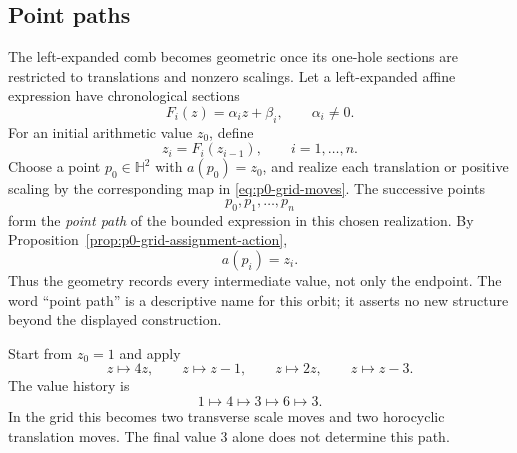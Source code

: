 \subsection{Point paths}
\label{subsec:p0-point-paths}

The left-expanded comb becomes geometric once its one-hole sections are
restricted to translations and nonzero scalings.  Let a left-expanded affine
expression have chronological sections
\[
  F_i(z)=\alpha_i z+\beta_i,
  \qquad \alpha_i\ne0.
\]
For an initial arithmetic value $z_0$, define
\[
  z_i=F_i(z_{i-1}),
  \qquad i=1,\ldots,n.
\]
Choose a point $p_0\in\mathbb H^2$ with $a(p_0)=z_0$, and realize each
translation or positive scaling by the corresponding map in
\eqref{eq:p0-grid-moves}.  The successive points
\[
  p_0,p_1,\ldots,p_n
\]
form the \emph{point path} of the bounded expression in this chosen realization.
By Proposition~\ref{prop:p0-grid-assignment-action},
\[
  a(p_i)=z_i.
\]
Thus the geometry records every intermediate value, not only the endpoint.  The
word ``point path'' is a descriptive name for this orbit; it asserts no new
structure beyond the displayed construction.

\begin{example}
\label{ex:p0-four-step-path}
Start from $z_0=1$ and apply
\[
  z\mapsto4z,
  \qquad z\mapsto z-1,
  \qquad z\mapsto2z,
  \qquad z\mapsto z-3.
\]
The value history is
\[
  1\longmapsto4\longmapsto3\longmapsto6\longmapsto3.
\]
In the grid this becomes two transverse scale moves and two horocyclic
translation moves.  The final value $3$ alone does not determine this path.
\end{example}

